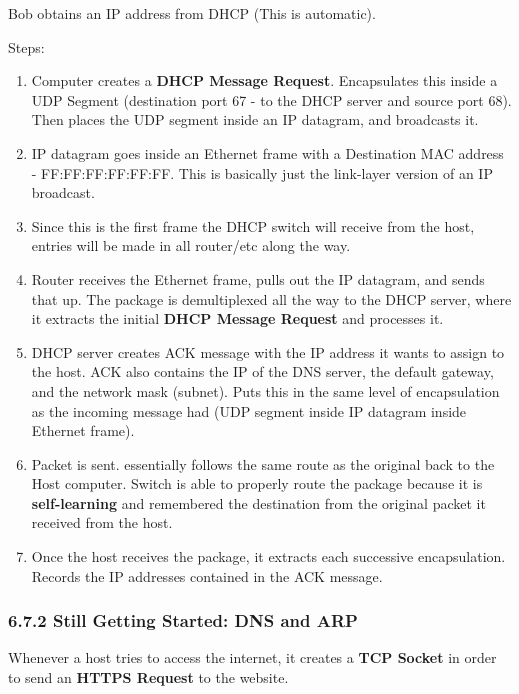 \documentclass[11pt]{article}
\begin{document}
Bob obtains an IP address from DHCP (This is automatic).

Steps:

\begin{enumerate}
\item Computer creates a \textbf{DHCP Message Request}. Encapsulates this inside a UDP Segment (destination port 67 - to the DHCP server and source port 68). Then places the UDP segment inside an IP datagram, and broadcasts it.
\item IP datagram goes inside an Ethernet frame with a Destination MAC address - FF:FF:FF:FF:FF:FF. This is basically just the link-layer version of an IP broadcast.
\item Since this is the first frame the DHCP switch will receive from the host, entries will be made in all router/etc along the way.
\item Router receives the Ethernet frame, pulls out the IP datagram, and sends that up. The package is demultiplexed all the way to the DHCP server, where it extracts the initial \textbf{DHCP Message Request} and processes it.
\item DHCP server creates ACK message with the IP address it wants to assign to the host. ACK also contains the IP of the DNS server, the default gateway, and the network mask (subnet). Puts this in the same level of encapsulation as the incoming message had (UDP segment inside IP datagram inside Ethernet frame).
\item Packet is sent. essentially follows the same route as the original back to the Host computer. Switch is able to properly route the package because it is \textbf{self-learning} and remembered the destination from the original packet it received from the host.
\item Once the host receives the package, it extracts each successive encapsulation. Records the IP addresses contained in the ACK message.
\end{enumerate}

\subsubsection{6.7.2 Still Getting Started: DNS and ARP}
\label{sec:org3c98219}

Whenever a host tries to access the internet, it creates a \textbf{TCP Socket} in order to send an \textbf{HTTPS Request} to the website.
\end{document}
